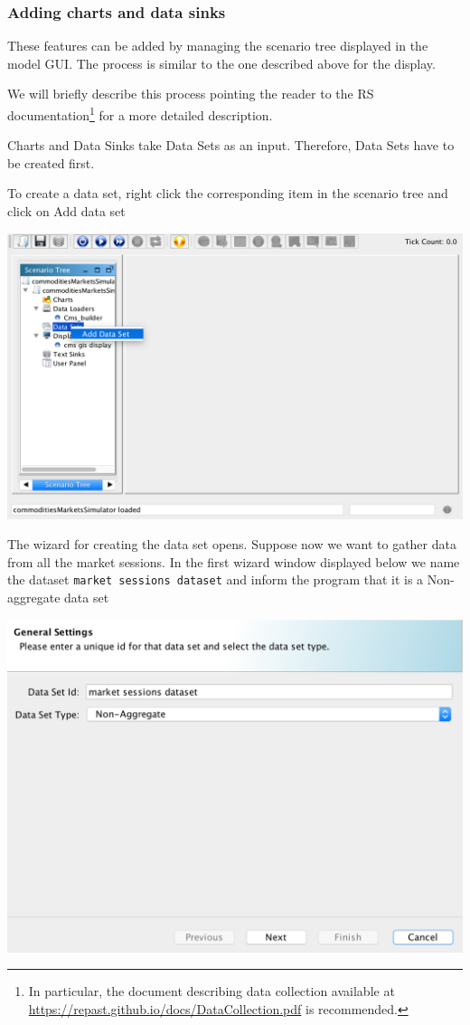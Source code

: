 \documentclass{article}
\begin{document}
\subsubsection{Adding charts and data sinks}

These features can be added by managing the scenario tree displayed in the model GUI. The process is similar to the one described above for the display.

We will briefly describe this process pointing the reader to the RS documentation\footnote{In particular, the document describing data collection available at \url{https://repast.github.io/docs/DataCollection.pdf} is recommended.} for a more detailed description. 

Charts and Data Sinks take Data Sets as an input. Therefore, Data Sets have to be created first.

To create a data set, right click the corresponding item in the scenario tree and click on Add data set

\includegraphics[scale=0.35]{fig_cms_rs_data1}

The wizard for creating the data set opens. Suppose now we want to gather data from all the market sessions. In the first wizard window displayed below we name the dataset \verb+market sessions dataset+ and inform the program that it is a Non-aggregate data set

\includegraphics[scale=0.35]{fig_cms_rs_data2}
\end{document}
